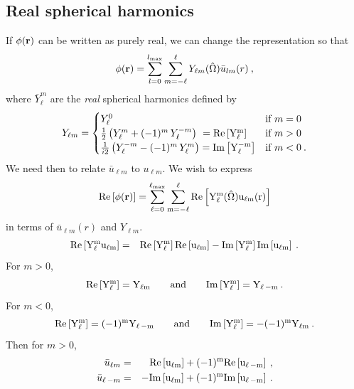 \subsection{Real spherical harmonics}
\renewcommand{\Re}{\rm Re}
\renewcommand{\Im}{\rm Im}
If $\phi(\vr)$ can be written as purely real, we can change the
representation so that
\begin{equation}
\phi(\vr) = \sum_{l=0}^{l_\text{max}} \sum_{m=-\ell}^\ell Y_{\ell m}(\hat{\Omega})
\bar{u}_{lm}(r)\:,
\end{equation}
where $\bar{Y}_\ell^m$ are the {\em real} spherical harmonics defined by
\begin{equation}
Y_{\ell m} = \begin{cases}
Y_\ell^0 & \mbox{if } m=0\\
{1\over 2}\left(Y_\ell^m+(-1)^m \, Y_\ell^{-m}\right) \ = \Re\left[Y_\ell^m\right]
& \mbox{if } m>0 \\
{1\over i 2}\left(Y_\ell^{-m}-(-1)^{m}\, Y_\ell^{m}\right) = \Im\left[Y_\ell^{-m}\right]
&\mbox{if } m<0\:.
\end{cases}
\end{equation}
We need then to relate $\bar{u}_{\ell m}$ to $u_{\ell m}$.  We wish
to express
\begin{equation}
\Re\left[\phi(\vr)\right] = \sum_{\ell=0}^{\ell_\text{max}} \sum_{m=-\ell}^\ell
\Re\left[Y_\ell^m (\hat{\Omega}) u_{\ell m}(r)\right]
\end{equation}
in terms of $\bar{u}_{\ell m}(r)$ and $Y_{\ell m}$.
\begin{eqnarray}
\Re\left[Y_\ell^m u_{\ell m}\right] & = & \Re\left[Y_\ell^m\right]
\Re\left[u_{\ell m}\right] - \Im\left[Y_\ell^m\right] \Im\left[u_{\ell m}\right]\:.
\end{eqnarray}
For $m>0$,
\begin{equation}
\Re\left[Y_\ell^m\right] = Y_{\ell m} \qquad \text{and} \qquad \Im\left[Y_\ell^m\right] = Y_{\ell\,-m}\:.
\end{equation}
For $m<0$,
\begin{equation}
\Re\left[Y_\ell^m\right] = (-1)^m Y_{\ell\, -m} \qquad \text and \qquad \Im\left[Y_\ell^m\right] = -(-1)^m Y_{\ell m}\:.
\end{equation}
Then for $m > 0$,
\begin{eqnarray}
\bar{u}_{\ell m} & = & \Re\left[u_{\ell m}\right] + (-1)^m \Re\left[u_{\ell\,-m}\right]\:, \\
\bar{u}_{\ell\, -m} & = & -\Im\left[u_{\ell m}\right] + (-1)^m \Im\left[u_{\ell\,-m}\right]\:.
\end{eqnarray}


